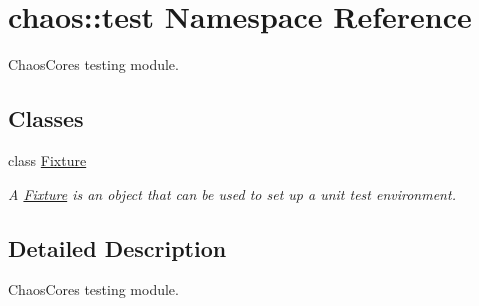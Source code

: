 \hypertarget{namespacechaos_1_1test}{}\section{chaos\+:\+:test Namespace Reference}
\label{namespacechaos_1_1test}


Chaos\+Core\textquotesingle{}s testing module.  


\subsection*{Classes}
\begin{DoxyCompactItemize}
\item 
class \hyperlink{classchaos_1_1test_1_1_fixture}{Fixture}
\begin{DoxyCompactList}\small\item\em A \hyperlink{classchaos_1_1test_1_1_fixture}{Fixture} is an object that can be used to set up a unit test environment. \end{DoxyCompactList}\end{DoxyCompactItemize}


\subsection{Detailed Description}
Chaos\+Core\textquotesingle{}s testing module. 